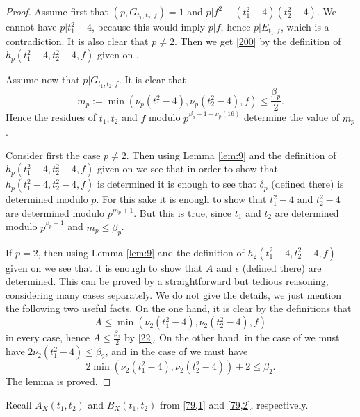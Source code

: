 \documentclass[12pt]{amsart}
\theoremstyle{definition}
\numberwithin{equation}{section}
\begin{document}
\begin{proof}
Assume first that $\left(p,G_{t_1,t_2,f}\right)=1$ and
$p|f^2-\left(t_1^2-4\right)\left(t_2^2-4\right)$. We cannot have $
p|t_1^2-4$, because
this would imply $p|f$, hence $p|E_{t_1,f}$, which is a
contradiction. It is also clear that $p\ne 2$. Then we get
\eqref{200} by the definition of $h_p\left(t_1^2-4,t_2^2-4,f\right
)$
given on \cite[pp 898-899]{biroClass}.

Assume now that $p|G_{t_1,t_2,f}$. It is clear that
\begin{equation}m_p:=\min\left(\nu_p\left(t_1^2-4\right),\nu_p\left
(t_2^2-4\right),f\right)\le\frac {\beta_p}2.\label{22}\end{equation}
Hence the residues of $t_1,t_2$ and $f$ modulo $p^{\beta_p+1+\nu_
p\left(16\right)}$
determine the value of $m_p$.

Consider first the case $p\ne 2$. Then using Lemma
\ref{lem:9} and the definition of $h_p\left(t_1^2-4,t_2^2-4,f\right
)$
given on \cite[pp 898-899]{biroClass} we
see that in order to show that $h_p\left(t_1^2-4,t_2^2-4,f\right)$ is
determined it is enough to see that $\delta_p$ (defined there) is
determined modulo $p$. For this sake it is enough to
show that $t_1^2-4$ and $t_2^2-4$ are determined modulo $p^{m_p+1}
.$
But this is true, since $t_1$ and $t_2$ are determined modulo
$p^{\beta_p+1}$ and $m_p\le\beta_p$.

If $p=2$, then using Lemma \ref{lem:9} and the definition of $h_2\left
(t_1^2-4,t_2^2-4,f\right)$
given on \cite[p 899]{biroClass} we see
that it is enough to show that $A$ and $\epsilon$ (defined there)
are determined. This can be proved by a straightforward
but tedious reasoning, considering many cases separately.
We do not give the details, we just mention the
following two useful facts. On the one hand, it is clear by the definitions that
\[A\le\min\left(\nu_2\left(t_1^2-4\right),\nu_2\left(t_2^2-4\right
),f\right)\]
in every case, hence $A\le\frac {\beta_2}2$ by \eqref{22}. On the other
hand, in the case of \cite[(1.3)]{biroClass} we
must have $2\nu_2\left(t_1^2-4\right)\le\beta_2$, and in the case of
\cite[(1.4)]{biroClass} we must have
\[2\min\left(\nu_2\left(t_1^2-4\right),\nu_2\left(t_2^2-4\right)\right
)+2\le\beta_2.\]
The lemma is proved.
\end{proof}

Recall $A_X\left(t_1,t_2\right)$ and $B_X\left(t_1,t_2\right)$ from \eqref{79,1} and
\eqref{79,2}, respectively.
\end{document}
